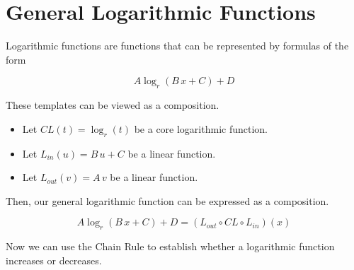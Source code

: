 \documentclass{ximera}
\begin{document}
\section*{General Logarithmic Functions}


Logarithmic functions are functions that can be represented by formulas of the form


\[  A \log_r(B \, x + C) + D  \]



These templates can be viewed as a composition.





\begin{itemize}
\item Let $CL(t) = \log_r(t)$ be a core logarithmic function.
\item Let $L_{in}(u) = B \, u + C$ be a linear function.
\item Let $L_{out}(v) = A \, v$ be a linear function.
\end{itemize}

Then, our general logarithmic function can be expressed as a composition.


\[
 A \log_r(B \, x + C) + D = (L_{out} \circ CL \circ L_{in})(x)
\]



Now we can use the Chain Rule to establish whether a logarithmic function increases or decreases.
\end{document}
